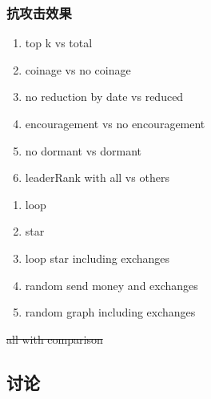 \subsubsection{抗攻击效果}
\begin{enumerate}
\item top k vs total
\item coinage vs no coinage
\item no reduction by date vs reduced
\item encouragement vs no encouragement
\item no dormant vs dormant
\item leaderRank with all vs others
\end{enumerate}
\begin{enumerate}
	\item loop
	\item star
	\item loop star including exchanges
	\item random send money and exchanges
	\item random graph including exchanges
\end{enumerate}

\st{all with comparison}

\subsection{讨论} \label{sec:discuss}
